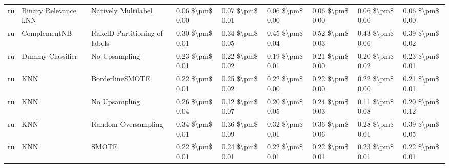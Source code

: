 \begin{tabular}{lllllllll}
      ru &            Binary Relevance kNN &           Natively Multilabel & 0.06 \$\textbackslash pm\$ 0.00 &           0.07 \$\textbackslash pm\$ 0.01 &       0.06 \$\textbackslash pm\$ 0.00 &        0.06 \$\textbackslash pm\$ 0.00 &                         0.06 \$\textbackslash pm\$ 0.00 &     0.06 \$\textbackslash pm\$ 0.00 \\
      ru &                    ComplementNB & RakelD Partitioning of labels & 0.30 \$\textbackslash pm\$ 0.01 &           0.34 \$\textbackslash pm\$ 0.05 &       0.45 \$\textbackslash pm\$ 0.04 &        0.52 \$\textbackslash pm\$ 0.03 &                         0.43 \$\textbackslash pm\$ 0.06 &     0.39 \$\textbackslash pm\$ 0.02 \\
      ru &                Dummy Classifier &                 No Upsampling & 0.23 \$\textbackslash pm\$ 0.01 &           0.22 \$\textbackslash pm\$ 0.02 &       0.19 \$\textbackslash pm\$ 0.01 &        0.21 \$\textbackslash pm\$ 0.00 &                         0.20 \$\textbackslash pm\$ 0.02 &     0.23 \$\textbackslash pm\$ 0.01 \\
      ru &                             KNN &               BorderlineSMOTE & 0.22 \$\textbackslash pm\$ 0.01 &           0.25 \$\textbackslash pm\$ 0.02 &       0.22 \$\textbackslash pm\$ 0.00 &        0.22 \$\textbackslash pm\$ 0.00 &                         0.22 \$\textbackslash pm\$ 0.00 &     0.21 \$\textbackslash pm\$ 0.01 \\
      ru &                             KNN &                 No Upsampling & 0.26 \$\textbackslash pm\$ 0.04 &           0.12 \$\textbackslash pm\$ 0.07 &       0.20 \$\textbackslash pm\$ 0.05 &        0.24 \$\textbackslash pm\$ 0.03 &                         0.11 \$\textbackslash pm\$ 0.08 &     0.20 \$\textbackslash pm\$ 0.12 \\
      ru &                             KNN &           Random Oversampling & 0.34 \$\textbackslash pm\$ 0.01 &           0.36 \$\textbackslash pm\$ 0.09 &       0.32 \$\textbackslash pm\$ 0.01 &        0.36 \$\textbackslash pm\$ 0.06 &                         0.28 \$\textbackslash pm\$ 0.01 &     0.39 \$\textbackslash pm\$ 0.05 \\
      ru &                             KNN &                         SMOTE & 0.22 \$\textbackslash pm\$ 0.01 &           0.24 \$\textbackslash pm\$ 0.01 &       0.22 \$\textbackslash pm\$ 0.01 &        0.22 \$\textbackslash pm\$ 0.01 &                         0.23 \$\textbackslash pm\$ 0.01 &     0.22 \$\textbackslash pm\$ 0.01 \\

\end{tabular}
